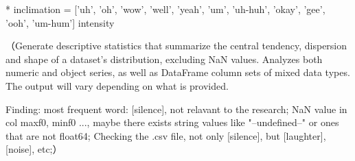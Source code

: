 * inclimation = ['uh', 'oh', 'wow', 'well', 'yeah', 'um', 'uh-huh', 'okay', 'gee', 'ooh', 'um-hum']
intensity


（Generate descriptive statistics that summarize the central tendency, dispersion and shape of a dataset's distribution, excluding NaN values.
Analyzes both numeric and object series, as well as DataFrame column sets of mixed data types. The output will vary depending on what is provided.

Finding:
most frequent word: [silence], not relavant to the research;
NaN value in col maxf0, minf0 ..., maybe there exists string values like "--undefined--" or ones that are not float64;
Checking the .csv file, not only [silence], but [laughter], [noise], etc;）



